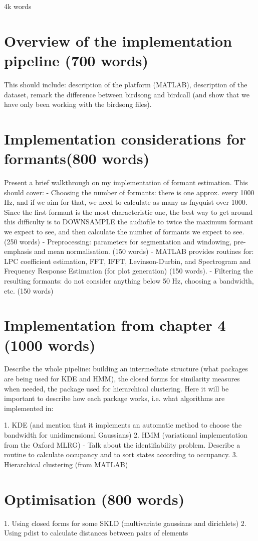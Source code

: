 \documentclass[../main.tex]{subfiles}
\begin{document}
4k words 

\section{Overview of the implementation pipeline (700 words)}
This should include: description of the platform (MATLAB), description of the dataset, remark the difference between birdsong and birdcall (and show that we have only been working with the birdsong files).
\section{Implementation considerations for formants(800 words)}
    Present a brief walkthrough on my implementation of formant estimation. This should cover:
    - Choosing the number of formants: there is one approx. every 1000 Hz, and if we aim for that, we need to calculate as many as fnyquist over 1000. Since the first formant is the most characteristic one, the best way to get around this difficulty is to DOWNSAMPLE the audiofile to twice the maximum formant we expect to see, and then calculate the number of formants we expect to see. (250 words)
    - Preprocessing: parameters for segmentation and windowing, pre-emphasis and mean normalisation. (150 words)
    - MATLAB provides routines for: LPC coefficient estimation, FFT, IFFT, Levinson-Durbin, and Spectrogram and Frequency Response Estimation (for plot generation) (150 words).
    - Filtering the resulting formants: do not consider anything below 50 Hz, choosing a bandwidth, etc.  (150 words)
    
\section{Implementation from chapter 4 (1000 words)}
Describe the whole pipeline: building an intermediate structure (what packages are being used for KDE and HMM), the closed forms for similarity measures when needed, the package used for hierarchical clustering. Here it will be important to describe how each package works, i.e. what algorithms are implemented in:

1. KDE (and mention that it implements an automatic method to choose the bandwidth for unidimensional Gaussians)
2. HMM (variational implementation from the Oxford MLRG)
    - Talk about the identifiability problem. Describe a routine to calculate occupancy and to sort states according to occupancy.
3. Hierarchical clustering (from MATLAB)

\section{Optimisation (800 words)}
1. Using closed forms for some SKLD (multivariate gaussians and dirichlets)
2. Using pdist to calculate distances between pairs of elements
\end{document}
